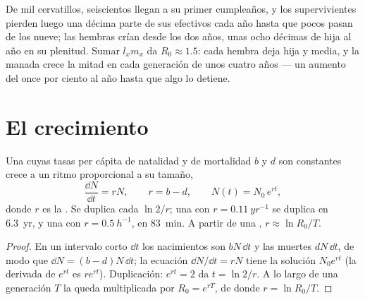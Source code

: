 \begin{example}\label{ex:b1:populations:deer}
De mil cervatillos, seiscientos llegan a su primer cumpleaños, y los
supervivientes pierden luego una décima parte de sus efectivos cada año
hasta que pocos pasan de los nueve; las hembras crían desde los dos años,
unas ocho décimas de hija al año en su plenitud. Sumar $l_x m_x$ da
$R_0 \approx 1.5$: cada hembra deja hija y media, y la manada crece la mitad
en cada generación de unos cuatro años --- un aumento del once por ciento al
año hasta que algo lo detiene.
\end{example}

\section{El crecimiento}

\begin{theorem}\label{thm:b1:populations:exponential}
Una  cuyas tasas per cápita de natalidad y de mortalidad $b$ y $d$
son constantes crece a un ritmo proporcional a su tamaño,
\[
\frac{\dd N}{\dd t} = rN, \qquad r = b - d, \qquad N(t) = N_0\,e^{rt},
\]
donde $r$ es la \emph{}. Se duplica cada
$\ln 2/r$; una  con $r = \qty{0.11}{yr^{-1}}$ se duplica en
\qty{6.3}{yr}, y una con $r = \qty{0.5}{h^{-1}}$, en \qty{83}{min}. A partir
de una , $r \approx \ln R_0 / T$.
\end{theorem}
\begin{proof}
En un intervalo corto $\dd t$ los nacimientos son $bN\,\dd t$ y las muertes
$dN\,\dd t$, de modo que $\dd N = (b - d)N\,\dd t$; la ecuación
$\dd N/\dd t = rN$ tiene la solución $N_0 e^{rt}$ (la derivada de
$e^{rt}$ es $re^{rt}$). Duplicación: $e^{rt} = 2$ da $t = \ln 2/r$. A lo
largo de una generación $T$ la  queda multiplicada por
$R_0 = e^{rT}$, de donde $r = \ln R_0/T$.
\end{proof}

